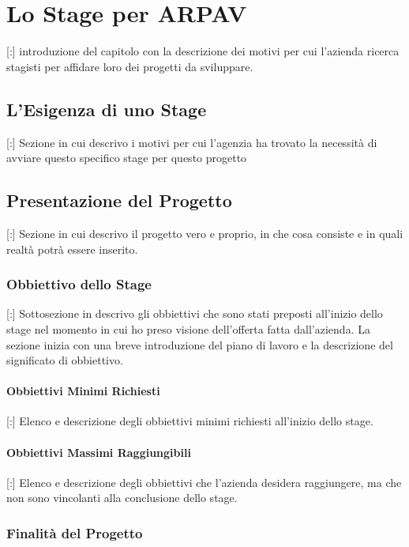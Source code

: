 \chapter{Lo Stage per ARPAV}
\thispagestyle{fancy} 

[:] introduzione del capitolo con la descrizione dei motivi per cui l'azienda ricerca stagisti per affidare loro dei progetti da sviluppare.

\section{L'Esigenza di uno Stage}

[:] Sezione in cui descrivo i motivi per cui l'agenzia ha trovato la necessità di avviare questo specifico stage per questo progetto

\section{Presentazione del Progetto}

[:] Sezione in cui descrivo il progetto vero e proprio, in che cosa consiste e in quali realtà potrà essere inserito.

\subsection{Obbiettivo dello Stage}

[:] Sottosezione in descrivo gli obbiettivi che sono stati preposti all'inizio dello stage nel momento in cui ho preso visione dell'offerta fatta dall'azienda.
La sezione inizia con una breve introduzione del piano di lavoro e la descrizione del significato di obbiettivo.

\subsubsection{Obbiettivi Minimi Richiesti}

[:] Elenco e descrizione degli obbiettivi minimi richiesti all'inizio dello stage.

\subsubsection{Obbiettivi Massimi Raggiungibili}

[:] Elenco e descrizione degli obbiettivi che l'azienda desidera raggiungere, ma che non sono vincolanti alla conclusione dello stage.

\subsection{Finalità del Progetto}

